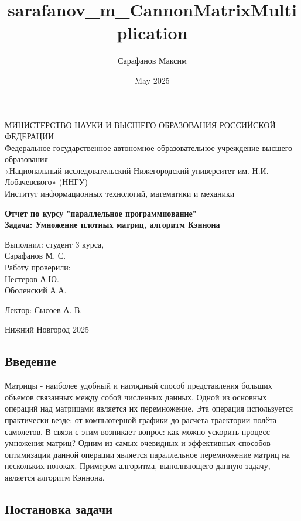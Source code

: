 \documentclass[20pt]{article}
\title{sarafanov_m_CannonMatrixMultiplication}
\author{Сарафанов Максим }
\date{May 2025}
\begin{document}
\begin{titlepage}
\begin{center}
МИНИСТЕРСТВО НАУКИ И ВЫСШЕГО ОБРАЗОВАНИЯ РОССИЙСКОЙ ФЕДЕРАЦИИ \\
    Федеральное государственное автономное образовательное учреждение высшего образования \\
    «Национальный исследовательский Нижегородский университет им. Н.И. Лобачевского» (ННГУ) \\
    Институт информационных технологий, математики и механики
\end{center}
\vspace{3cm}
\begin{center}
    \textbf{Отчет по курсу "параллельное программиование" \\
            Задача: Умножение плотных матриц, алгоритм Кэннона}
\end{center}
\vspace{4cm}

\begin{flushright}
Выполнил: студент 3 курса, \\ Сарафанов М. С. \\
\vspace{0.5cm}
Работу проверили:\\
 Нестеров А.Ю. \\ 
 Оболенский А.А.

\vspace{0.5cm}
 Лектор: Сысоев А. В. \\
\end{flushright}
\vspace{3.5cm}
\begin{center}
    Нижний Новгород 2025\newpage
\end{center}
\end{titlepage}
\begin{center}
    \section{Введение}
\end{center}

Матрицы - наиболее удобный и наглядный способ представления больших объемов связанных между собой численных данных. Одной из основных операций над матрицами является их перемножение. Эта операция используется практически везде: от компьютерной графики до расчета траектории полёта самолетов. В связи с этим возникает вопрос: как можно ускорить процесс умножения матриц? Одним из самых очевидных и эффективных способов оптимизации данной операции является параллельное перемножение матриц на нескольких потоках. Примером алгоритма, выполняющего данную задачу, является алгоритм Кэннона.
\newpage
\begin{center}
    \section{Постановка задачи}
\end{center}
\end{document}
